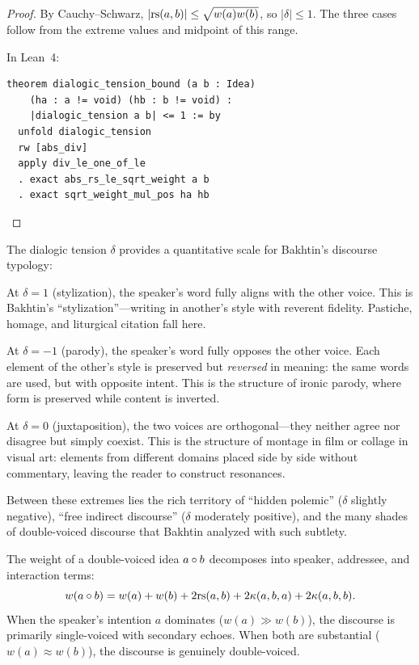 \begin{proof}
By Cauchy--Schwarz, $|\mathrm{rs}(a, b)| \leq \sqrt{w(a) w(b)}$, so
$|\delta| \leq 1$.  The three cases follow from the extreme values and
midpoint of this range.

In Lean~4:
\begin{lstlisting}
theorem dialogic_tension_bound (a b : Idea)
    (ha : a != void) (hb : b != void) :
    |dialogic_tension a b| <= 1 := by
  unfold dialogic_tension
  rw [abs_div]
  apply div_le_one_of_le
  . exact abs_rs_le_sqrt_weight a b
  . exact sqrt_weight_mul_pos ha hb
\end{lstlisting}
\end{proof}

\begin{interpretation}
\label{interp:discourse-spectrum}
The dialogic tension $\delta$ provides a quantitative scale for Bakhtin's
discourse typology:

At $\delta = 1$ (stylization), the speaker's word fully aligns with the
other voice.  This is Bakhtin's ``stylization''---writing in another's style
with reverent fidelity.  Pastiche, homage, and liturgical citation fall here.

At $\delta = -1$ (parody), the speaker's word fully opposes the other voice.
Each element of the other's style is preserved but \emph{reversed} in meaning:
the same words are used, but with opposite intent.  This is the structure of
ironic parody, where form is preserved while content is inverted.

At $\delta = 0$ (juxtaposition), the two voices are orthogonal---they neither
agree nor disagree but simply coexist.  This is the structure of montage in
film or collage in visual art: elements from different domains placed side by
side without commentary, leaving the reader to construct resonances.

Between these extremes lies the rich territory of ``hidden polemic'' ($\delta$
slightly negative), ``free indirect discourse'' ($\delta$ moderately positive),
and the many shades of double-voiced discourse that Bakhtin analyzed with such
subtlety.
\end{interpretation}


\begin{theorem}
\label{thm:double-voiced-weight}
The weight of a double-voiced idea $a \circ b$ decomposes into speaker, addressee, and interaction terms:
\[
  w(a \circ b) = w(a) + w(b) + 2\mathrm{rs}(a, b) + 2\kappa(a, b, a) + 2\kappa(a, b, b).
\]
When the speaker's intention $a$ dominates ($w(a) \gg w(b)$), the discourse is primarily single-voiced with secondary echoes.  When both are substantial ($w(a) \approx w(b)$), the discourse is genuinely double-voiced.
\end{theorem}

